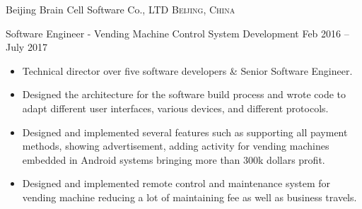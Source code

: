 \documentclass[10pt,a4paper]{article}
\begin{document}
\headedsection
{Beijing Brain Cell Software Co., LTD}
{\textsc{Beijing, China}}
  {
    \headedsubsection
    {Software Engineer - Vending Machine Control System Development}
    {Feb 2016 -- July 2017}
    {\vspace{0.1em}
      \begin{itemize}
        \setlength{\itemsep}{0.3em}
      \item Technical director over five software developers \& Senior Software Engineer.
      \item Designed the architecture for the software build process and wrote code to adapt different user interfaces, various devices, and different protocols.
      \item Designed and implemented several features such as supporting all payment methods, showing advertisement, adding activity for vending machines embedded in Android systems bringing more than 300k dollars profit.
      \item Designed and implemented remote control and maintenance system for vending machine reducing a lot of maintaining fee as well as business travels.
        
        

        

       

\end{itemize}}}
\end{document}
